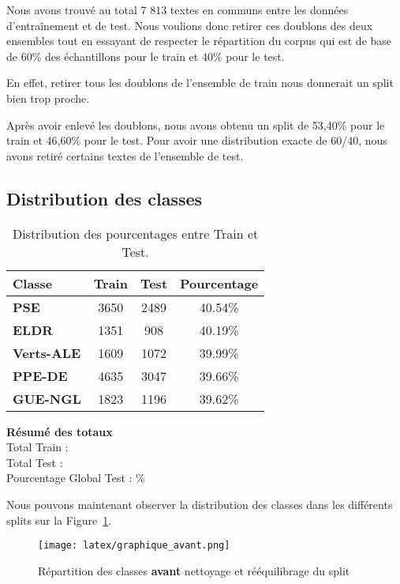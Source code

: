 \documentclass[11pt]{article}
\begin{document}
Nous avons trouvé au total 7 813 textes en communs entre les données d'entraînement et de test. Nous voulions donc retirer ces doublons des deux ensembles tout en essayant de respecter le répartition du corpus qui est de base de 60\% des échantillons pour le train et 40\% pour le test. 

En effet, retirer tous les doublons de l'ensemble de train nous donnerait un split bien trop proche.

Après avoir enlevé les doublons, nous avons obtenu un split de 53,40\% pour le train et 46,60\% pour le test. Pour avoir une distribution exacte de 60/40, nous avons retiré certains textes de l'ensemble de test.

\subsection{Distribution des classes}
\begin{table}[ht]
    \centering
    \begin{tabular}{|l|c|c|c|}
        \hline
        \textbf{Classe}   & \textbf{Train} & \textbf{Test} & \textbf{Pourcentage} \\ \hline
        \textbf{PSE}      & 3650           & 2489          & 40.54\%              \\ \hline
        \textbf{ELDR}     & 1351           & 908           & 40.19\%              \\ \hline
        \textbf{Verts-ALE}& 1609           & 1072          & 39.99\%              \\ \hline
        \textbf{PPE-DE}   & 4635           & 3047          & 39.66\%              \\ \hline
        \textbf{GUE-NGL}  & 1823           & 1196          & 39.62\%              \\ \hline
    \end{tabular}
    \caption{Distribution des pourcentages entre Train et Test.}
    \label{tab:pourcentage_test}
\end{table}

\textbf{Résumé des totaux} \\
Total Train :  \\
Total Test  :  \\
Pourcentage Global Test : \%

Nous pouvons maintenant observer la distribution des classes dans les différents splits sur la Figure~\ref{fig:graph_avant}.

\begin{figure}[h]
  \texttt{[image: latex/graphique\_avant.png]}
  \caption{Répartition des classes \textbf{avant} nettoyage et rééquilibrage du split}
  \label{fig:graph_avant} %
\end{figure}
\end{document}
